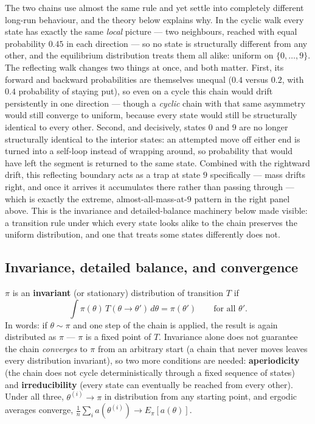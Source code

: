 \documentclass[
  letterpaper,
  DIV=11,
  numbers=noendperiod]{scrreprt}
\begin{document}
The two chains use almost the same rule and yet settle into completely
different long-run behaviour, and the theory below explains why. In the
cyclic walk every state has exactly the same \emph{local} picture ---
two neighbours, reached with equal probability \(0.45\) in each
direction --- so no state is structurally different from any other, and
the equilibrium distribution treats them all alike: uniform on
\(\{0,\ldots,9\}\). The reflecting walk changes two things at once, and
both matter. First, its forward and backward probabilities are
themselves unequal (\(0.4\) versus \(0.2\), with \(0.4\) probability of
staying put), so even on a cycle this chain would drift persistently in
one direction --- though a \emph{cyclic} chain with that same asymmetry
would still converge to uniform, because every state would still be
structurally identical to every other. Second, and decisively, states
\(0\) and \(9\) are no longer structurally identical to the interior
states: an attempted move off either end is turned into a self-loop
instead of wrapping around, so probability that would have left the
segment is returned to the same state. Combined with the rightward
drift, this reflecting boundary acts as a trap at state \(9\)
specifically --- mass drifts right, and once it arrives it accumulates
there rather than passing through --- which is exactly the extreme,
almost-all-mass-at-\(9\) pattern in the right panel above. This is the
invariance and detailed-balance machinery below made visible: a
transition rule under which every state looks alike to the chain
preserves the uniform distribution, and one that treats some states
differently does not.

\subsection{Invariance, detailed balance, and
convergence}\label{invariance-detailed-balance-and-convergence}

\(\pi\) is an \textbf{invariant} (or stationary) distribution of
transition \(T\) if \[
\int \pi(\theta)\, T(\theta \to \theta') \, d\theta = \pi(\theta') \qquad \text{for all } \theta'.
\] In words: if \(\theta \sim \pi\) and one step of the chain is
applied, the result is again distributed as \(\pi\) --- \(\pi\) is a
fixed point of \(T\). Invariance alone does not guarantee the chain
\emph{converges} to \(\pi\) from an arbitrary start (a chain that never
moves leaves every distribution invariant), so two more conditions are
needed: \textbf{aperiodicity} (the chain does not cycle
deterministically through a fixed sequence of states) and
\textbf{irreducibility} (every state can eventually be reached from
every other). Under all three, \(\theta^{(i)} \to \pi\) in distribution
from any starting point, and ergodic averages converge,
\(\frac1n\sum_i a(\theta^{(i)}) \to E_\pi[a(\theta)]\).
\end{document}
